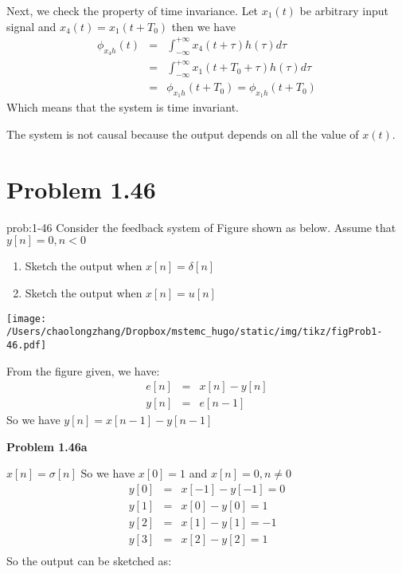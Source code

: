 \documentclass[koma,a4paper,utopia,12pt,listings-color,microtype,paralist,colorlinks,urlcolor=red]{org-article}
\begin{document}
Next, we check the property of time invariance.
Let \(x_{1}(t)\) be arbitrary input signal and \(x_{4}(t) = x_{1}(t+T_{0})\)
then we have
\begin{eqnarray*}
\phi_{x_{4}h}(t) &=& \int_{-\infty}^{+\infty} x_{4}(t+\tau) h(\tau) d\tau \\
&=& \int_{-\infty}^{+\infty} x_{1}(t+T_{0}+\tau) h(\tau) d\tau \\
&=& \phi_{x_{1}h}(t+T_{0}) = \phi_{x_{1}h}(t+T_{0})
\end{eqnarray*}
Which means that the system is time invariant.

The system is not causal because the output depends on all the value of \(x(t)\).
\section{Problem 1.46}
\label{sec:orgd263cd1}


\begin{prob}[]{prob:1-46}
Consider the feedback system of Figure shown as below. Assume that \(y[n] =
    0, n<0\)

\begin{enumerate}
\item Sketch the output when \(x[n] = \delta[n]\)
\item Sketch the output when \(x[n] = u[n]\)
\end{enumerate}

\begin{center}
\texttt{[image: /Users/chaolongzhang/Dropbox/mstemc\_hugo/static/img/tikz/figProb1-46.pdf]}
\end{center}
\label{prob:1-46}
\end{prob}

From the figure given, we have:
\begin{eqnarray*}
e[n]&=& x[n] - y[n] \\
y[n] &=& e[n-1]
\end{eqnarray*}
So we have \(y[n] = x[n-1] - y[n-1]\)


\textbf{Problem 1.46a}

\(x[n] = \sigma[n]\) So  we have \(x[0] = 1\) and \(x[n] = 0, n\neq 0\)
\begin{eqnarray*}
y[0]&=& x[-1] - y[-1] = 0 \\
y[1]&=& x[0] - y[0] = 1 \\
y[2]&=& x[1] - y[1] = -1 \\
y[3]&=& x[2] - y[2] = 1 \\
\end{eqnarray*}
So the output can be sketched as:
\end{document}
